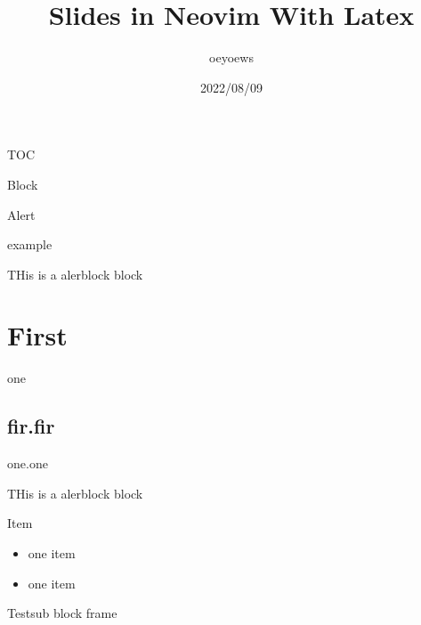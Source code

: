 \documentclass{beamer}
\title{Slides in Neovim With Latex}
\author{oeyoews}
\date{2022/08/09}
\begin{document}
\begin{frame}[plain]
  \titlepage
\end{frame}

\begin{frame}{TOC}
  \tableofcontents
\end{frame}

\begin{frame}{Block}

  \begin{alertblock}{Alert}

  \end{alertblock}

  \begin{exampleblock}{example}

    THis is a alerblock block

  \end{exampleblock}

  \section{First}%
  \label{sec:First}
  one

  \subsection{fir.fir}%
  \label{sub:fir.fir}
  one.one

  THis is a alerblock block

\end{frame}


\begin{frame}{Item}

  \begin{itemize}
    \item  one item
    \item  one item
  \end{itemize}

\end{frame}

\begin{frame}{Test}{sub}
  block frame
\end{frame}
\end{document}
